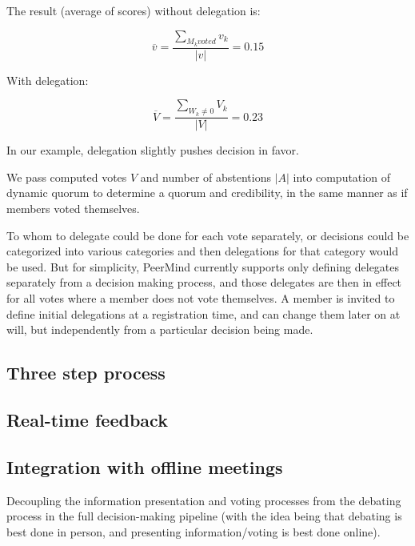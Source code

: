 \documentclass{sigchi}
\begin{document}
The result (average of scores) without delegation is:

\begin{displaymath}
\overline{v} = \frac{\sum_{M_k voted} v_k}{\left| v \right|} = 0.15
\end{displaymath}

With delegation:

\begin{displaymath}
\overline{V} = \frac{\sum_{W_k \ne 0} V_k}{\left| V \right|} = 0.23
\end{displaymath}

In our example, delegation slightly pushes decision in favor.

We pass computed votes $V$ and number of abstentions $\left| A \right|$ into computation of dynamic quorum to determine
a quorum and credibility, in the same manner as if members voted themselves.


To whom to delegate could be done for each vote separately, or decisions could be categorized into various
categories and then delegations for that category would be used.
But for simplicity, PeerMind currently supports only defining delegates separately from a decision making process,
and those delegates are then in effect for all votes where a member does not vote themselves.
A member is invited to define initial delegations at a registration time, and can change them later on at will,
but independently from a particular decision being made.

\subsection{Three step process}

\subsection{Real-time feedback}



\subsection{Integration with offline meetings}

Decoupling the information presentation and voting processes from the debating process in the full decision-making
pipeline (with the idea being that debating is best done in person, and presenting information/voting is best done online).
\end{document}
